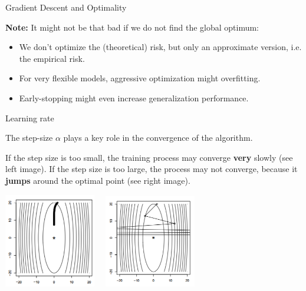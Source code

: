 \begin{vbframe}{Gradient Descent and Optimality}
\begin{minipage}{0.5\textwidth}
\begin{figure}
    \end{figure}
  \end{minipage}  

  \framebreak 

  \textbf{Note: } It might not be that bad if we do not find the global optimum:  

  \begin{itemize}
    \item We don't optimize the (theoretical) risk, but only an approximate version, i.e. the empirical risk. 
    \item For very flexible models, aggressive optimization might overfitting. 
    \item Early-stopping might even increase generalization performance. 
  \end{itemize}

\end{vbframe}


\begin{vbframe}{Learning rate}

The step-size $\alpha$ plays a key role in the convergence of the algorithm.
\lz

If the step size is too small, the training process may converge \textbf{very} slowly (see left image). If the step size is too large, the process may not converge, because it \textbf{jumps} around the optimal point (see right image).

\begin{center}
\includegraphics[width = 0.3\textwidth]{figure/stepsize_small.png}~~
\includegraphics[width = 0.3\textwidth]{figure/stepsize_large.png}
\end{center}

\end{vbframe}

